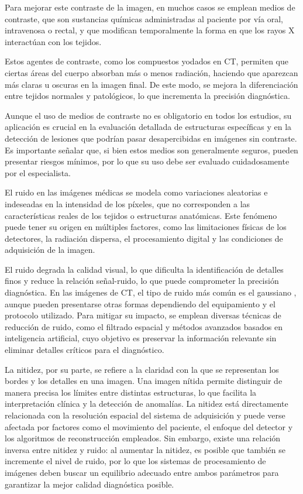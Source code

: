 Para mejorar este contraste de la imagen, en muchos casos se emplean medios de contraste, que son sustancias químicas administradas al paciente por vía oral, intravenosa o rectal, y que modifican temporalmente la forma en que los rayos X interactúan con los tejidos.

Estos agentes de contraste, como los compuestos yodados en CT, permiten que ciertas áreas del cuerpo absorban más o menos radiación, haciendo que aparezcan más claras u oscuras en la imagen final. De este modo, se mejora la diferenciación entre tejidos normales y patológicos, lo que incrementa la precisión diagnóstica.

Aunque el uso de medios de contraste no es obligatorio en todos los estudios, su aplicación es crucial en la evaluación detallada de estructuras específicas y en la detección de lesiones que podrían pasar desapercibidas en imágenes sin contraste. Es importante señalar que, si bien estos medios son generalmente seguros, pueden presentar riesgos mínimos, por lo que su uso debe ser evaluado cuidadosamente por el especialista.

El ruido en las imágenes médicas se modela como variaciones aleatorias e indeseadas en la intensidad de los píxeles, que no corresponden a las características reales de los tejidos o estructuras anatómicas. Este fenómeno puede tener su origen en múltiples factores, como las limitaciones físicas de los detectores, la radiación dispersa, el procesamiento digital y las condiciones de adquisición de la imagen.

El ruido degrada la calidad visual, lo que dificulta la identificación de detalles finos y reduce la relación señal-ruido, lo que puede comprometer la precisión diagnóstica. En las imágenes de CT, el tipo de ruido más común es el gaussiano \cite{rangayyan2005biomedical}, aunque pueden presentarse otras formas dependiendo del equipamiento y el protocolo utilizado. Para mitigar su impacto, se emplean diversas técnicas de reducción de ruido, como el filtrado espacial y métodos avanzados basados en inteligencia artificial, cuyo objetivo es preservar la información relevante sin eliminar detalles críticos para el diagnóstico.

La nitidez, por su parte, se refiere a la claridad con la que se representan los bordes y los detalles en una imagen. Una imagen nítida permite distinguir de manera precisa los límites entre distintas estructuras, lo que facilita la interpretación clínica y la detección de anomalías. La nitidez está directamente relacionada con la resolución espacial del sistema de adquisición y puede verse afectada por factores como el movimiento del paciente, el enfoque del detector y los algoritmos de reconstrucción empleados. Sin embargo, existe una relación inversa entre nitidez y ruido: al aumentar la nitidez, es posible que también se incremente el nivel de ruido, por lo que los sistemas de procesamiento de imágenes deben buscar un equilibrio adecuado entre ambos parámetros para garantizar la mejor calidad diagnóstica posible.

